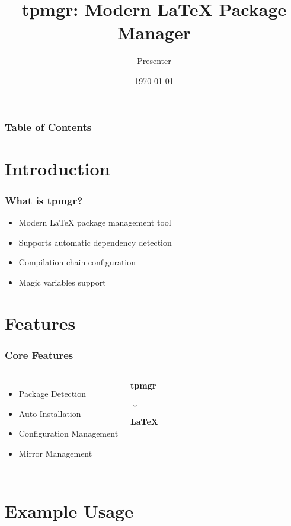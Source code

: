 \documentclass{beamer}
\title{tpmgr: Modern LaTeX Package Manager}
\author{Presenter}
\institute{tpmgr Project}
\date{\today}
\begin{document}
\frame{\titlepage}

\begin{frame}
\frametitle{Table of Contents}
\tableofcontents
\end{frame}

\section{Introduction}

\begin{frame}
\frametitle{What is tpmgr?}
\begin{itemize}
    \item Modern LaTeX package management tool
    \item Supports automatic dependency detection
    \item Compilation chain configuration
    \item Magic variables support
\end{itemize}
\end{frame}

\section{Features}

\begin{frame}
\frametitle{Core Features}
\begin{columns}
\begin{itemize}
    \item Package Detection
    \item Auto Installation
    \item Configuration Management
    \item Mirror Management
\end{itemize}

\begin{center}
\textbf{tpmgr}

$\downarrow$

\textbf{LaTeX}
\end{center}

\end{columns}
\end{frame}

\section{Example Usage}
\end{document}
